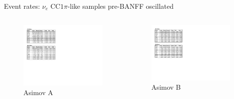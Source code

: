 \documentclass{beamer}
\begin{document}
\begin{frame}{Event rates: $\nu_e\text{ CC}1\pi$-like samples pre-BANFF oscillated}
	\centering

	\begin{columns}
		\begin{column}{0.5\paperwidth}
			\begin{figure}
				\includegraphics[page=3, trim={0cm 15cm 13cm 1cm}, clip, scale=0.52] {images/rates/prefit_A}
				\caption{Asimov A}
			\end{figure}
		\end{column}
		\begin{column}{0.5\paperwidth}
			\begin{figure}
				\includegraphics[page=3, trim={0cm 12.75cm 13cm 2.35cm}, clip, scale=0.52] {images/rates/prefit_B}
				\caption{Asimov B}
			\end{figure}
		\end{column}
	\end{columns}
\end{frame}
\end{document}
